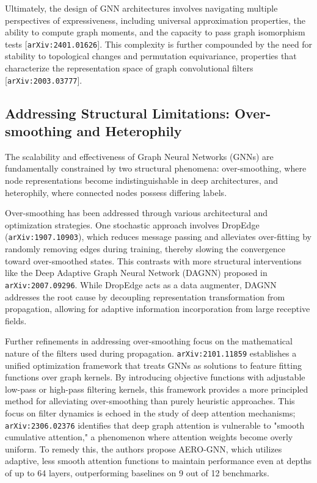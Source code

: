 \documentclass[11pt]{article}
\begin{document}
Ultimately, the design of GNN architectures involves navigating multiple perspectives of expressiveness, including universal approximation properties, the ability to compute graph moments, and the capacity to pass graph isomorphism tests [\texttt{arXiv:2401.01626}]. This complexity is further compounded by the need for stability to topological changes and permutation equivariance, properties that characterize the representation space of graph convolutional filters [\texttt{arXiv:2003.03777}].

\subsection{Addressing Structural Limitations: Over-smoothing and Heterophily}

The scalability and effectiveness of Graph Neural Networks (GNNs) are fundamentally constrained by two structural phenomena: over-smoothing, where node representations become indistinguishable in deep architectures, and heterophily, where connected nodes possess differing labels.

Over-smoothing has been addressed through various architectural and optimization strategies. One stochastic approach involves DropEdge (\texttt{arXiv:1907.10903}), which reduces message passing and alleviates over-fitting by randomly removing edges during training, thereby slowing the convergence toward over-smoothed states. This contrasts with more structural interventions like the Deep Adaptive Graph Neural Network (DAGNN) proposed in \texttt{arXiv:2007.09296}. While DropEdge acts as a data augmenter, DAGNN addresses the root cause by decoupling representation transformation from propagation, allowing for adaptive information incorporation from large receptive fields.

Further refinements in addressing over-smoothing focus on the mathematical nature of the filters used during propagation. \texttt{arXiv:2101.11859} establishes a unified optimization framework that treats GNNs as solutions to feature fitting functions over graph kernels. By introducing objective functions with adjustable low-pass or high-pass filtering kernels, this framework provides a more principled method for alleviating over-smoothing than purely heuristic approaches. This focus on filter dynamics is echoed in the study of deep attention mechanisms; \texttt{arXiv:2306.02376} identifies that deep graph attention is vulnerable to "smooth cumulative attention," a phenomenon where attention weights become overly uniform. To remedy this, the authors propose AERO-GNN, which utilizes adaptive, less smooth attention functions to maintain performance even at depths of up to 64 layers, outperforming baselines on 9 out of 12 benchmarks.
\end{document}
